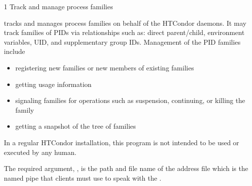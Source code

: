 \begin{ManPage}{\label{man-condor-procd}}{1}
{Track and manage process families}

\Synopsis {}


\Description 

 tracks and manages process families on behalf of the
HTCondor daemons. 
It may track families of PIDs via relationships such
as: direct parent/child, environment variables, UID, and supplementary
group IDs.  
Management of the PID families include 
\begin{itemize}
\item registering new families or new members of existing families
\item getting usage information
\item signaling families for operations such as suspension, 
continuing, or killing the family 
\item getting a snapshot of the tree of families 
\end{itemize}
In a regular HTCondor installation, 
this program is not intended to be used or executed by any human.

The required argument, 
,
is the path and file name of the address file which is the named pipe
that clients must use to speak with the .
	
\begin{Options}

	

	
	


\end{Options}
\end{ManPage}
